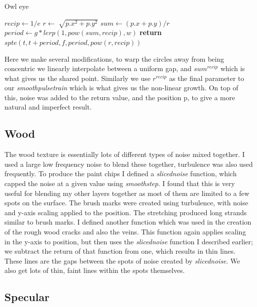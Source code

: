 \documentclass[]{acmsiggraph}
\begin{document}
\begin{algorithm}
\caption{Owl eye}\label{alg:owleye}
\begin{algorithmic}[1]
\State $recip \gets 1/e$ 
\State $r\gets \sqrt[]{p.x^2 + p.y^2}$
\State $sum\gets (p.x + p.y)/r$
\State $period \gets g * lerp(1, pow(sum,recip), w)$
\State \textbf{return} $spte(t, t + period, f, period, pow(r, recip))$
\EndProcedure
\end{algorithmic}
\end{algorithm}
\newline
 Here we make several modifications, to warp the circles away from being concentric we linearly interpolate between a uniform gap, and $sum^{recip}$ which is what gives us the shared point. Similarly we use $r^{recip}$ as the final parameter to our \textit{smoothpulsetrain} which is what gives us the non-linear growth.
On top of this, noise was added to the return value, and the position p, to give a more natural and imperfect result.

\subsection{Wood}

The wood texture is essentially lots of different types of noise mixed together. I used a large low frequency noise to blend these together, turbulence was also used frequently. To produce the paint chips I defined a \textit{slicednoise} function, which capped the noise at a given value using \textit{smoothstep}. I found that this is very useful for blending my other layers together as most of them are limited to a few spots on the surface. The brush marks were created using turbulence, with noise and y-axis scaling applied to the position. The stretching produced long strands similar to brush marks. I defined another function which was used in the creation of the rough wood cracks and also the veins. This function again  applies scaling in the y-axis to position, but then uses the \textit{slicednoise} function I described earlier; we subtract the return of that function from one, which results in thin lines. These lines are the gaps between the spots of noise created by \textit{slicednoise}. We also get lots of thin, faint lines within the spots themselves.

\subsection{Specular}
\end{document}
